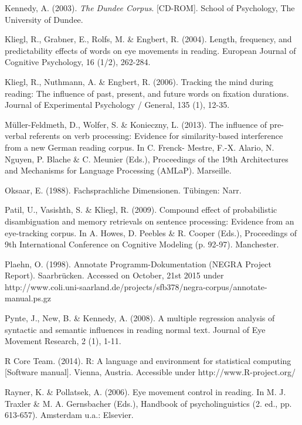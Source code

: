 \documentclass[output=paper]{langsci/langscibook}
\begin{document}
Kennedy, A. (2003). \textit{The Dundee Corpus}. [CD-ROM]. School of Psychology, The University of Dundee.



Kliegl, R., Grabner, E., Rolfs, M. \& Engbert, R. (2004). Length, frequency, and predictability effects of words on eye movements in reading. European Journal of Cognitive Psychology, 16 (1/2), 262-284.



Kliegl, R., Nuthmann, A. \& Engbert, R. (2006). Tracking the mind during reading: The influence of past, present, and future words on fixation durations. Journal of Experimental Psychology / General, 135 (1), 12-35.



Müller-Feldmeth, D., Wolfer, S. \& Konieczny, L. (2013). The influence of pre-verbal referents on verb processing: Evidence for similarity-based interference from a new German reading corpus. In C. Frenck- Mestre, F.-X. Alario, N. Nguyen, P. Blache \& C. Meunier (Eds.), Proceedings of the 19th Architectures and Mechanisms for Language Processing (AMLaP). Marseille.



Oksaar, E. (1988). Fachsprachliche Dimensionen. Tübingen: Narr.



Patil, U., Vasishth, S. \& Kliegl, R. (2009). Compound effect of probabilistic disambiguation and memory retrievals on sentence processing: Evidence from an eye-tracking corpus. In A. Howes, D. Peebles \& R. Cooper (Eds.), Proceedings of 9th International Conference on Cognitive Modeling (p. 92-97). Manchester.



Plaehn, O. (1998). Annotate Programm-Dokumentation (NEGRA Project Report). Saarbrücken. Accessed on October, 21st 2015 under http://www.coli.uni-saarland.de/projects/sfb378/negra-corpus/annotate-manual.ps.gz



Pynte, J., New, B. \& Kennedy, A. (2008). A multiple regression analysis of syntactic and semantic influences in reading normal text. Journal of Eye Movement Research, 2 (1), 1-11.



R Core Team. (2014). R: A language and environment for statistical computing [Software manual]. Vienna, Austria. Accessible under http://www.R-project.org/



Rayner, K. \& Pollatsek, A. (2006). Eye movement control in reading. In M. J. Traxler \& M. A. Gernsbacher (Eds.), Handbook of psycholinguistics (2. ed., pp. 613-657). Amsterdam u.a.: Elsevier.
\end{document}
